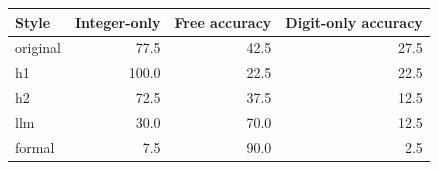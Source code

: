 \begin{tabular}{lrrr}\toprule
Style & Integer-only & Free accuracy & Digit-only accuracy\\\midrule
original & 77.5 & 42.5 & 27.5\\
h1 & 100.0 & 22.5 & 22.5\\
h2 & 72.5 & 37.5 & 12.5\\
llm & 30.0 & 70.0 & 12.5\\
formal & 7.5 & 90.0 & 2.5\\
\bottomrule\end{tabular}
